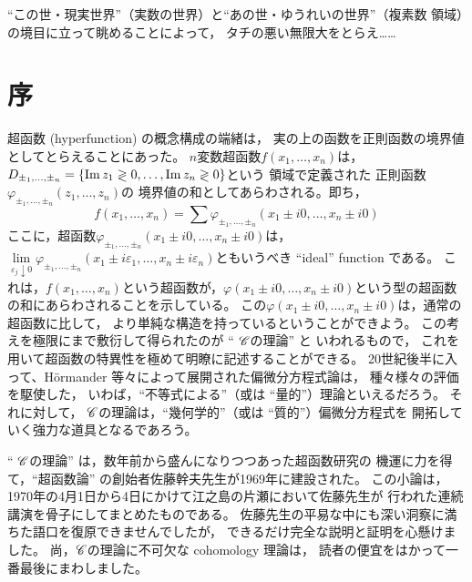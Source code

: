 \maketitle

``この世・現実世界''（実数の世界）と``あの世・ゆうれいの世界''（複素数
領域）の境目に立って眺めることによって，
タチの悪い無限大をとらえ\dots\dots


\setcounter{section}{-1}
\section{序}

超函数 (hyperfunction) の概念構成の端緒は，
実の上の函数を正則函数の境界値としてとらえることにあった。
$n$変数超函数\(f(x_1,\dots,x_n)\)は，
\(D_{\pm_1,\dots,\pm_n}
=\left\{\mathop{\mathrm{Im}}\nolimits z_1\gtrless 0,\dots,\mathop{\mathrm{Im}}\nolimits z_n\gtrless 0\right\}\)という
領域で定義された
正則函数\(\varphi_{\pm_1,\dots,\pm_n}(z_1,\dots,z_n)\)の
境界値の和としてあらわされる。即ち，
\[
    f(x_1,\dots,x_n)=
    \sum \varphi_{\pm_1,\dots,\pm_n}\left(
        x_{1}\pm i0,\dots,x_{n}\pm i0
    \right)
\]
ここに，超函数\(
    \varphi_{\pm_1,\dots,\pm_n}\left(x_{1}\pm i0,
    \dots,x_{n}\pm i0\right)
\)は，\(
    \lim\limits_{\varepsilon_{j}\downarrow0}
    \varphi_{\pm_1,\dots,\pm_n}\left(x_{1}\pm i\varepsilon_{1},
    \dots,x_{n}\pm i\varepsilon_{n}\right)
\)ともいうべき ``ideal'' function である。
これは，\(f(x_1,\dots,x_n)\)という超函数が，\(
    \varphi\left(x_1\pm i0,\dots,x_n\pm i0\right)
\)という型の超函数の和にあらわされることを示している。
この\(
    \varphi\left(x_1\pm i0,\dots,x_n\pm i0\right)
\)は，通常の超函数に比して，
より単純な構造を持っているということができよう。
この考えを極限にまで敷衍して得られたのが `` \(\mathscr{C}\)の理論'' と
いわれるもので，
これを用いて超函数の特異性を極めて明瞭に記述することができる。
20世紀後半に入って、H\"ormander 等々によって展開された偏微分方程式論は，
種々様々の評価を駆使した，
いわば，``不等式による''（或は ``量的''）理論といえるだろう。
それに対して，
\(\mathscr{C}\)の理論は，``幾何学的''（或は ``質的''）偏微分方程式を
開拓していく強力な道具となるであろう。

`` \(\mathscr{C}\)の理論'' は，数年前から盛んになりつつあった超函数研究の
機運に力を得て，``超函数論'' の創始者佐藤幹夫先生が1969年に建設された。
この小論は，1970年の4月1日から4日にかけて江之島の片瀬において佐藤先生が
行われた連続講演を骨子にしてまとめたものである。
佐藤先生の平易な中にも深い洞察に満ちた語口を復原できませんでしたが，
できるだけ完全な説明と証明を心懸けました。
尚，\(\mathscr{C}\)の理論に不可欠な cohomology 理論は，
読者の便宜をはかって一番最後にまわしました。


